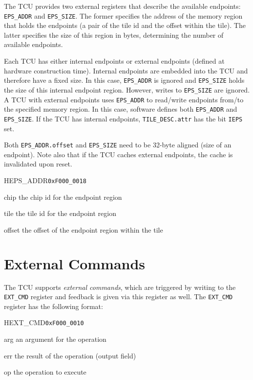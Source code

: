 The TCU provides two external registers that describe the available endpoints: \texttt{EPS\_ADDR}
and \texttt{EPS\_SIZE}. The former specifies the address of the memory region that holds the
endpoints (a pair of the tile id and the offset within the tile). The latter specifies the size of
this region in bytes, determining the number of available endpoints.

Each TCU has either internal endpoints or external endpoints (defined at hardware construction
time). Internal endpoints are embedded into the TCU and therefore have a fixed size. In this case,
\texttt{EPS\_ADDR} is ignored and \texttt{EPS\_SIZE} holds the size of this internal endpoint
region. However, writes to \texttt{EPS\_SIZE} are ignored. A TCU with external endpoints uses
\texttt{EPS\_ADDR} to read/write endpoints from/to the specified memory region. In this case,
software defines both \texttt{EPS\_ADDR} and \texttt{EPS\_SIZE}. If the TCU has internal endpoints,
\texttt{TILE\_DESC.attr} has the bit \texttt{IEPS} set.

Both \texttt{EPS\_ADDR.offset} and \texttt{EPS\_SIZE} need to be 32-byte aligned (size of an
endpoint). Note also that if the TCU caches external endpoints, the cache is invalidated upon reset.

\begin{register}{H}{EPS\_ADDR}{\texttt{0xF000\_0018}}
  \regnewline%
  \begin{regdesc}\begin{reglist}
    \item[chip] the chip id for the endpoint region
    \item[tile] the tile id for the endpoint region
    \item[offset] the offset of the endpoint region within the tile
  \end{reglist}\end{regdesc}
\end{register}

\section{External Commands}

The TCU supports \emph{external commands}, which are triggered by writing to the \texttt{EXT\_CMD}
register and feedback is given via this register as well. The \texttt{EXT\_CMD} register has the
following format:

\begin{register}{H}{EXT\_CMD}{\texttt{0xF000\_0010}}
  \regnewline%
  \begin{regdesc}\begin{reglist}
    \item[arg] an argument for the operation
    \item[err] the result of the operation (output field)
    \item[op] the operation to execute
  \end{reglist}\end{regdesc}
\end{register}

